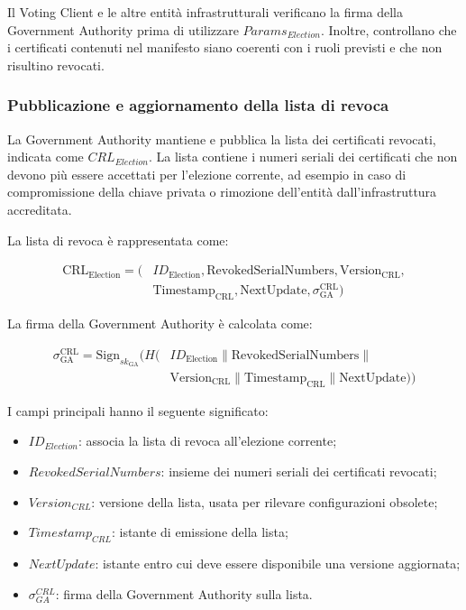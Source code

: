 \documentclass[a4paper,12pt]{article}
\begin{document}
Il Voting Client e le altre entit\`a infrastrutturali verificano la firma della Government Authority prima di utilizzare \(Params_{Election}\). 
Inoltre, controllano che i certificati contenuti nel manifesto siano coerenti con i ruoli previsti e che non risultino revocati.

\subsubsection{Pubblicazione e aggiornamento della lista di revoca}

La Government Authority mantiene e pubblica la lista dei certificati revocati, indicata come \(CRL_{Election}\). 
La lista contiene i numeri seriali dei certificati che non devono pi\`u essere accettati per l'elezione corrente, ad esempio in caso di compromissione della chiave privata o rimozione dell'entit\`a dall'infrastruttura accreditata.

La lista di revoca \`e rappresentata come:

\begin{equation}
\begin{split}
	\text{CRL}_{\text{Election}} = \Big( & ID_{\text{Election}}, \text{RevokedSerialNumbers}, \text{Version}_{\text{CRL}}, \\
	& \text{Timestamp}_{\text{CRL}}, \text{NextUpdate}, \sigma_{\text{GA}}^{\text{CRL}} \Big)
\end{split}
\end{equation}

La firma della Government Authority \`e calcolata come:

\begin{equation}
\begin{split}
	\sigma_{\text{GA}}^{\text{CRL}} = \text{Sign}_{sk_{\text{GA}}}\Big( H \big( & ID_{\text{Election}} \parallel \text{RevokedSerialNumbers} \parallel \\
	& \text{Version}_{\text{CRL}} \parallel \text{Timestamp}_{\text{CRL}} \parallel \text{NextUpdate} \big) \Big)
\end{split}
\end{equation}

I campi principali hanno il seguente significato:

\begin{itemize}
	\item \(ID_{Election}\): associa la lista di revoca all'elezione corrente;
	\item \(RevokedSerialNumbers\): insieme dei numeri seriali dei certificati revocati;
	\item \(Version_{CRL}\): versione della lista, usata per rilevare configurazioni obsolete;
	\item \(Timestamp_{CRL}\): istante di emissione della lista;
	\item \(NextUpdate\): istante entro cui deve essere disponibile una versione aggiornata;
	\item \(\sigma_{GA}^{CRL}\): firma della Government Authority sulla lista.
\end{itemize}
\end{document}
